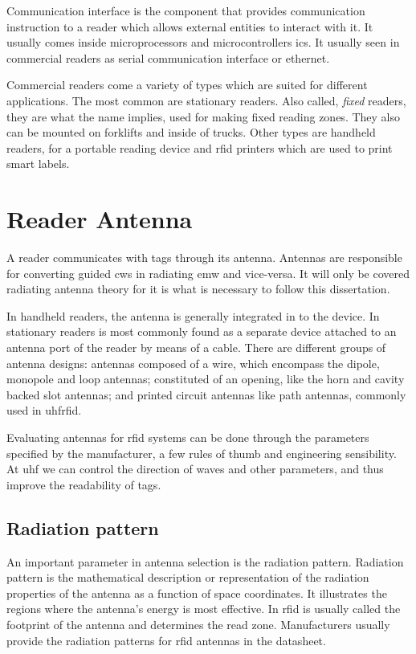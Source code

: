 Communication interface is the component that provides communication instruction to a reader which allows external entities to interact with it.
It usually comes inside microprocessors and microcontrollers \acp{ic}. It usually seen in commercial readers as serial communication interface or ethernet.

Commercial readers come a variety of types which are suited for different applications.
The most common are stationary readers. Also called, \emph{fixed} readers, they are what the name implies, used for making fixed reading zones. They also can be mounted on forklifts and inside of trucks.
Other types are handheld readers, for a portable reading device and \ac{rfid} printers which are used to print smart labels.

\section{Reader Antenna} \label{sec:antenna}

A reader communicates with tags through its antenna. 
Antennas are responsible for converting guided \acp{cw} in radiating \ac{emw} and vice-versa.
It will only be covered radiating antenna theory for it is what is necessary to follow this dissertation.

In handheld readers, the antenna is generally integrated in to the device. In stationary readers is most commonly found as a separate device attached to an antenna port of the reader by means of a cable.
There are different groups of antenna designs: antennas composed of a wire, which encompass the dipole, monopole and loop antennas; constituted of an opening, like the horn and cavity backed slot antennas; and printed circuit antennas like path antennas, commonly used in \ac{uhfrfid}.

Evaluating antennas for \ac{rfid} systems can be done through the parameters specified by the manufacturer, a few rules of thumb and engineering sensibility.
At \ac{uhf} we can control the direction of waves and other parameters, and thus improve the readability of tags.

\subsection{Radiation pattern}

An important parameter in antenna selection is the radiation pattern. 
Radiation pattern is the mathematical description or representation of the radiation properties of the antenna as a function of space coordinates.
It illustrates the regions where the antenna's energy is most effective.
In \ac{rfid} is usually called the footprint of the antenna and determines the read zone.
Manufacturers usually provide the radiation patterns for \ac{rfid} antennas in the datasheet.

